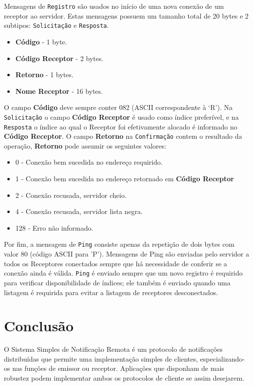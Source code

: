 \documentclass[12pt]{article}
\begin{document}
Mensagens de {\tt Registro} são usados no início de uma nova conexão de um receptor ao servidor.
Estas mensagens possuem um tamanho total de 20 bytes e 2 subtipos:
{\tt Solicitação} e {\tt Resposta}.
\begin{itemize}
\item {\bf Código} - 1 byte.
\item {\bf Código Receptor} - 2 bytes.
\item {\bf Retorno} - 1 bytes.
\item {\bf Nome Receptor} - 16 bytes.
\end{itemize}
O campo {\bf Código} deve sempre conter 082 (ASCII correspondente à `R').
Na {\tt Solicitação} o campo {\bf Código Receptor} é usado como índice preferível,
e na {\tt Resposta} o índice ao qual o Receptor foi efetivamente alocado é informado no {\bf Código Receptor}.
O campo {\bf Retorno} na {\tt Confirmação} contem o resultado da operação,
{\bf Retorno} pode assumir os seguintes valores:
\begin{itemize}
\item 0 - Conexão bem sucedida no endereço requirido.
\item 1 - Conexão bem sucedida no endereço retornado em {\bf Código Receptor}
\item 2 - Conexão recusada, servidor cheio.
\item 4 - Conexão recusada, servidor lista negra.
\item 128 - Erro não informado.
\end{itemize}

Por fim, a mensagem de {\tt Ping} consiste apenas da repetição de dois bytes com valor 80
(código ASCII para 'P').
Mensagens de Ping são enviadas pelo servidor a todos os Receptores conectados sempre que
há necessidade de conferir se a conexão ainda é válida.
{\tt Ping} é enviado sempre que um novo registro é requirido para verificar disponibilidade de índices;
ele também é enviado quando uma listagem é requirida para evitar a listagem de receptores desconectados.

\section{Conclusão}\label{sec:Conclusao}

O Sistema Simples de Notificação Remota é um protocolo de notificações distribuídas que
permite uma implementação simples de clientes,
especializando-os nas funções de emissor ou receptor.
Aplicações que disponham de mais robustez podem implementar ambos os protocolos de cliente se assim desejarem.
\end{document}

